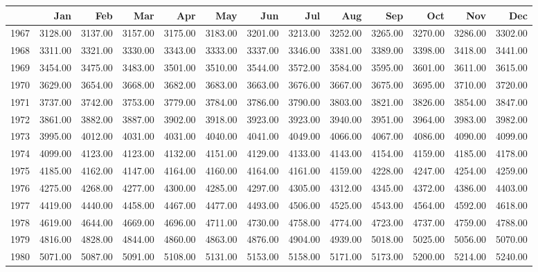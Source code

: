\begin{longtable}{rrrrrrrrrrrrr}
  \hline
 & Jan & Feb & Mar & Apr & May & Jun & Jul & Aug & Sep & Oct & Nov & Dec \\ 
  \hline
1967 & 3128.00 & 3137.00 & 3157.00 & 3175.00 & 3183.00 & 3201.00 & 3213.00 & 3252.00 & 3265.00 & 3270.00 & 3286.00 & 3302.00 \\ 
  1968 & 3311.00 & 3321.00 & 3330.00 & 3343.00 & 3333.00 & 3337.00 & 3346.00 & 3381.00 & 3389.00 & 3398.00 & 3418.00 & 3441.00 \\ 
  1969 & 3454.00 & 3475.00 & 3483.00 & 3501.00 & 3510.00 & 3544.00 & 3572.00 & 3584.00 & 3595.00 & 3601.00 & 3611.00 & 3615.00 \\ 
  1970 & 3629.00 & 3654.00 & 3668.00 & 3682.00 & 3683.00 & 3663.00 & 3676.00 & 3667.00 & 3675.00 & 3695.00 & 3710.00 & 3720.00 \\ 
  1971 & 3737.00 & 3742.00 & 3753.00 & 3779.00 & 3784.00 & 3786.00 & 3790.00 & 3803.00 & 3821.00 & 3826.00 & 3854.00 & 3847.00 \\ 
  1972 & 3861.00 & 3882.00 & 3887.00 & 3902.00 & 3918.00 & 3923.00 & 3923.00 & 3940.00 & 3951.00 & 3964.00 & 3983.00 & 3982.00 \\ 
  1973 & 3995.00 & 4012.00 & 4031.00 & 4031.00 & 4040.00 & 4041.00 & 4049.00 & 4066.00 & 4067.00 & 4086.00 & 4090.00 & 4099.00 \\ 
  1974 & 4099.00 & 4123.00 & 4123.00 & 4132.00 & 4151.00 & 4129.00 & 4133.00 & 4143.00 & 4154.00 & 4159.00 & 4185.00 & 4178.00 \\ 
  1975 & 4185.00 & 4162.00 & 4147.00 & 4164.00 & 4160.00 & 4164.00 & 4161.00 & 4159.00 & 4228.00 & 4247.00 & 4254.00 & 4259.00 \\ 
  1976 & 4275.00 & 4268.00 & 4277.00 & 4300.00 & 4285.00 & 4297.00 & 4305.00 & 4312.00 & 4345.00 & 4372.00 & 4386.00 & 4403.00 \\ 
  1977 & 4419.00 & 4440.00 & 4458.00 & 4467.00 & 4477.00 & 4493.00 & 4506.00 & 4525.00 & 4543.00 & 4564.00 & 4592.00 & 4618.00 \\ 
  1978 & 4619.00 & 4644.00 & 4669.00 & 4696.00 & 4711.00 & 4730.00 & 4758.00 & 4774.00 & 4723.00 & 4737.00 & 4759.00 & 4788.00 \\ 
  1979 & 4816.00 & 4828.00 & 4844.00 & 4860.00 & 4863.00 & 4876.00 & 4904.00 & 4939.00 & 5018.00 & 5025.00 & 5056.00 & 5070.00 \\ 
  1980 & 5071.00 & 5087.00 & 5091.00 & 5108.00 & 5131.00 & 5153.00 & 5158.00 & 5171.00 & 5173.00 & 5200.00 & 5214.00 & 5240.00 \\ 

\end{longtable}
